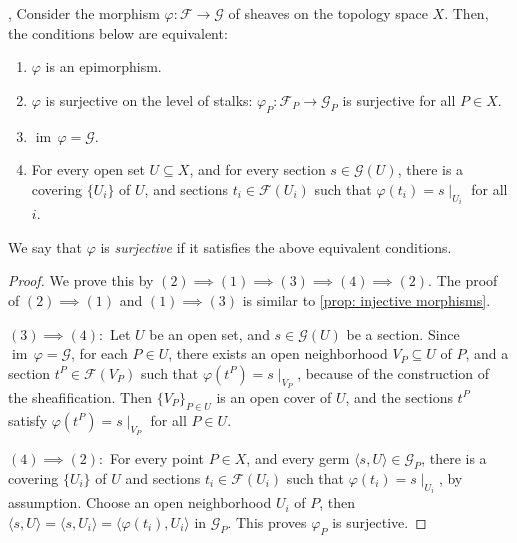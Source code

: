 \documentclass[11pt]{article}
\begin{document}
\begin{proposition}
    \label{prop: surjective morphisms}
    \cite[2.4 O]{vakilTheRisingSea}, \cite[Ex 1.3]{hartsAG} 
    Consider the morphism $\varphi:\mathscr{F} \to \mathscr{G}$ of sheaves 
    on the topology space $X$. 
    Then, the conditions below are equivalent: 
    \begin{enumerate}[label = (\arabic*)]
        \item $\varphi$ is an epimorphism. 
        \item $\varphi$ is surjective on the level of stalks: 
        $\varphi_{P}:\mathscr{F}_{P}\to \mathscr{G}_{P}$ is surjective for all $P \in X$. 
    
        \item $\operatorname{im}\,\varphi = \mathscr{G}$. 
        \item For every open set $ U \subseteq X $, 
        and for every section $ s \in \mathscr{G}(U) $, 
        there is a covering $ \{U_{i}\} $ of $ U $, 
        and sections $ t_{i} \in \mathscr{F}(U_{i}) $ 
        such that $ \varphi(t_{i})=s\mid_{U_{i}} $ for all $ i $. 
    \end{enumerate}

    We say that $\varphi$ is \emph{surjective} 
    if it satisfies the above equivalent conditions.
\end{proposition}

\begin{proof}
We prove this by $ (2) \implies (1) \implies (3) \implies (4) \implies (2) $. 
The proof of $ (2) \implies (1) $ and $ (1) \implies (3) $ is similar to \autoref{prop: injective morphisms}. 

$ (3) \implies (4): $ Let $ U $ be an open set, and $ s \in \mathscr{G}(U) $ be a section. 
Since $ \operatorname{im}\,\varphi = \mathscr{G} $, for each $ P \in U $, 
there exists an open neighborhood $ V_{P} \subseteq U $ of $ P $, and a section 
$ t^{P} \in \mathscr{F}(V_{P}) $ such that $ \varphi(t^{P}) = s\mid_{V_{P}} $, 
because of the construction of the sheafification. 
Then $ \{V_{P}\}_{P \in U} $ is an open cover of $ U $, and the sections $ t^{P} $ satisfy 
$ \varphi(t^{P}) = s\mid_{V_{P}} $ for all $ P \in U $. 

$ (4) \implies (2): $ For every point $ P \in X $, and every germ 
$ \langle s, U \rangle \in \mathscr{G}_{P} $, there is a covering $ \{U_{i}\} $ of $ U $ and sections 
$ t_{i} \in \mathscr{F}(U_{i}) $ such that $ \varphi(t_{i})=s \mid_{U_{i}} $, by assumption. 
Choose an open neighborhood $ U_{i} $ of $ P $, then 
$ \langle s,U \rangle = \langle s,U_{i} \rangle =  \langle \varphi(t_{i}),U_{i} \rangle $ 
in $ \mathscr{G}_{P} $. This proves $ \varphi_{P} $ is surjective. 
\end{proof}
\end{document}

